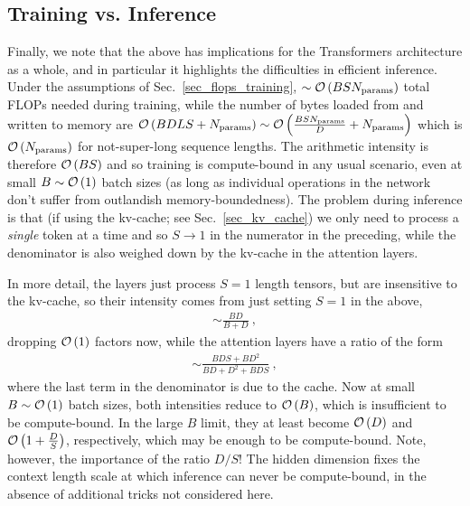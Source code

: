 \documentclass[11pt]{article}
\begin{document}
\subsection{Training vs. Inference}

Finally, we note that the above has implications for the Transformers architecture as a whole, and
in particular it highlights the difficulties in efficient inference. Under the assumptions of
Sec.~\ref{sec_flops_training}, $ \sim \mathcal{O} \left( BSN _{ {\rm params}  }  \right)  $
total FLOPs needed during training, while the number of bytes loaded from and written to memory are
$ \mathcal{O} \left( BDLS + N _{ {\rm params}  } \right)  \sim \mathcal{O} \left( \frac{ BS N _{ {\rm params}  } }{ D}+ N _{ {\rm params}  } \right)  $
which is $ \mathcal{O} \left( N _{ {\rm  params}  } \right)  $ for not-super-long sequence lengths.  The
arithmetic intensity is therefore $ \mathcal{O} \left( BS \right)  $ and so training is compute-bound in any
usual scenario, even at small $B \sim \mathcal{O} \left( 1 \right)  $ batch sizes (as long as individual operations in the network don't suffer from outlandish
memory-boundedness). The problem during inference is that (if using the kv-cache; see
Sec.~\ref{sec_kv_cache}) we only need to process a \textit{single} token at a time and so $ S
\longrightarrow 1 $ in the numerator in the preceding, while the denominator is also weighed down by
the  kv-cache in the attention layers.

In more detail, the  layers just process $ S=1 $ length tensors, but are insensitive
to the kv-cache, so their intensity comes from just setting $ S=1 $ in the above,
\begin{align}
   \sim \frac{ BD  }{ B + D } \ ,
\end{align}
dropping $\mathcal{O} \left( 1 \right)  $ factors now, while the attention layers have a ratio of the form
\begin{align}
    \sim \frac{ BDS+BD ^{ 2 } }{ BD + D ^{ 2 }+BDS }\ ,
\end{align}
where the last term in the denominator is due to the cache. Now at small $B \sim \mathcal{O} \left( 1
\right)  $ batch sizes, both intensities reduce to $ \mathcal{O} \left( B \right)  $, which is
insufficient to be compute-bound.  In the large $ B $ limit, they at least become $ \mathcal{O} \left( D
\right)  $ and $ \mathcal{O} \left( 1 + \frac{ D }{ S } \right)  $, respectively, which may be enough to be
compute-bound. Note, however, the importance of the ratio $ D/S $! The hidden dimension fixes the context
length scale at which inference can never be compute-bound, in the absence of additional tricks not
considered here.
\end{document}
